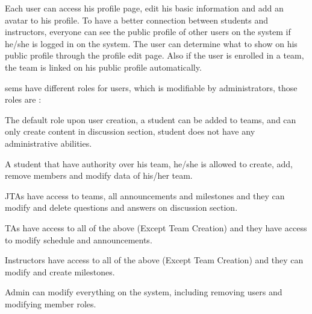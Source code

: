\newParagraph
Each user can access his profile page, edit his basic information and add an avatar to his profile. To have a better connection
between students and instructors, everyone can see the public profile of other users on the system if he/she is logged in on the system. The user
can determine what to show on his public profile through the profile edit page. Also if the user is enrolled in a team, the team
is linked on his public profile automatically.

\newParagraph
\ac{sems} have different roles for users, which is modifiable by administrators, those roles are :

\begin{description}[align=left]
\item [student] The default role upon user creation, a student can be added to teams, and can only create content in discussion section,
student does not have any administrative abilities.
\item [scrum master] A student that have authority over his team, he/she is allowed to create, add, remove members and modify data of his/her team.
\item [\ac{jta}] JTAs have access to teams, all announcements and milestones and they can modify and delete questions and answers on discussion section.
\item [\ac{ta}] TAs have access to all of the above (Except Team Creation) and they have access to modify schedule and announcements.
\item [Instructor] Instructors have access to all of the above (Except Team Creation) and they can modify and create milestones.
\item [Admin] Admin can modify everything on the system, including removing users and modifying member roles.
\end{description}

